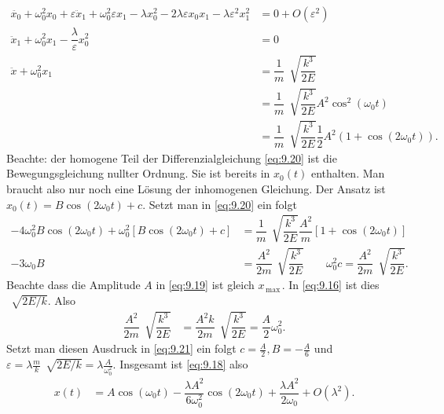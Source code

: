 \documentclass[a4paper,12pt]{article}
\numberwithin{equation}{section}
\begin{document}
\begin{align} 
        \ddot{x_0}+\omega _0^2x_0+\varepsilon \ddot{x}_1+\omega _0^2\varepsilon x_1-\lambda x_0^2-2\lambda \varepsilon x_0x_1-\lambda \varepsilon ^2x_1^2&=0+O\left(\varepsilon ^2\right)\nonumber \\
        \ddot{x}_1+\omega _0^2x_1-\dfrac{\lambda }{\varepsilon }x_0^2&=0\nonumber \\
        \ddot{x}+\omega _0^2x_1&=\dfrac{1}{m}\,\sqrt[]{\dfrac{k^3}{2E}}\nonumber \\
                               &=\dfrac{1}{m}\,\sqrt[]{\dfrac{k^3}{2E}}A^2\cos ^2\left(\omega _0t\right)\nonumber \\
                               &=\dfrac{1}{m}\,\sqrt[]{\dfrac{k^3}{2E}}\dfrac{1}{2}A^2\left(1+\cos \left(2\omega _0t\right)\right)\label{eq:9.20}
.\end{align} 
Beachte: der homogene Teil der Differenzialgleichung \eqref{eq:9.20} ist die Bewegungsgleichung nullter Ordnung. Sie ist bereits in $x_0\left(t\right)$ enthalten. Man braucht also nur noch eine Lösung der inhomogenen Gleichung. Der Ansatz ist $x_0\left(t\right)=B\cos \left(2\omega _0t\right)+c$. Setzt man in \eqref{eq:9.20} ein folgt
\begin{align} 
        -4\omega _0^2B\cos \left(2\omega _0t\right)+\omega _0^2\left[B\cos \left(2\omega _0t\right)+c\right]&=\dfrac{1}{m}\,\sqrt[]{\dfrac{k^3}{2E}}\dfrac{A^2}{m}\left[1+\cos \left(2\omega _0t\right)\right]\nonumber \\
        -3\omega _0B&=\dfrac{A^2}{2m}\,\sqrt[]{\dfrac{k^3}{2E}}\qquad \omega _0^2c=\dfrac{A^2}{2m}\,\sqrt[]{\dfrac{k^3}{2E}}\label{eq:9.21}
.\end{align} 
Beachte dass die Amplitude $A$ in \eqref{eq:9.19} ist gleich $x_{\,\text{max}\,}$. In \eqref{eq:9.16} ist dies $\,\sqrt[]{2E/k}$. Also
\begin{align} 
        \dfrac{A^2}{2m}\,\sqrt[]{\dfrac{k^3}{2E}}&=\dfrac{A^2k}{2m}\,\sqrt[]{\dfrac{k^3}{2E}}=\dfrac{A}{2}\omega _0^2\nonumber 
.\end{align} 
Setzt man diesen Ausdruck in \eqref{eq:9.21} ein folgt $c=\tfrac{A}{2},B=-\tfrac{A}{6}$ und $\varepsilon =\lambda \tfrac{m}{k}\,\sqrt[]{2E/k}=\lambda \tfrac{A}{\omega _0^2}$. Insgesamt ist \eqref{eq:9.18} also
\begin{align} 
        x\left(t\right)&=A\cos \left(\omega _0t\right)-\dfrac{\lambda A^2}{6\omega _0^2}\cos \left(2\omega _0t\right)+\dfrac{\lambda A^2}{2\omega _0}+O\left(\lambda ^2\right)\label{eq:9.22}
.\end{align} 
\end{document}

